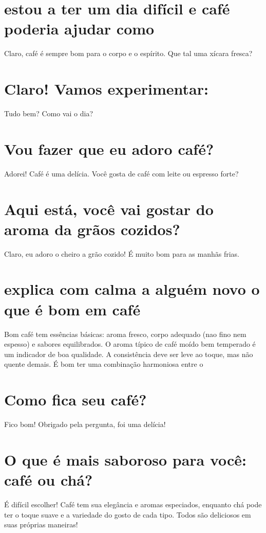 \documentclass[11pt,a4paper]{article}
\begin{document}
\maketitle
\begin{abstract}Exploração do ollama a partir de sementes banais (nível 3). Teoria continua de fora.\end{abstract}
\section{estou a ter um dia difícil e café poderia ajudar como}
Claro, café é sempre bom para o corpo e o espírito. Que tal uma xícara fresca?

\section{Claro! Vamos experimentar:}
Tudo bem? Como vai o dia?

\section{Vou fazer que eu adoro café?}
Adorei! Café é uma delícia. Você gosta de café com leite ou espresso forte?

\section{Aqui está, você vai gostar do aroma da grãos cozidos?}
Claro, eu adoro o cheiro a grão cozido! É muito bom para as manhãs frias.

\section{explica com calma a alguém novo o que é bom em café}
Bom café tem essências básicas: aroma fresco, corpo adequado (nao fino nem espesso) e sabores equilibrados. O aroma típico de café moído bem temperado é um indicador de boa qualidade. A consistência deve ser leve ao toque, mas não quente demais. É bom ter uma combinação harmoniosa entre o

\section{Como fica seu café?}
Fico bom! Obrigado pela pergunta, foi uma delícia!

\section{O que é mais saboroso para você: café ou chá?}
É difícil escolher! Café tem sua elegância e aromas especiados, enquanto chá pode ter o toque suave e a variedade do gosto de cada tipo. Todos são deliciosos em suas próprias maneiras!
\end{document}
